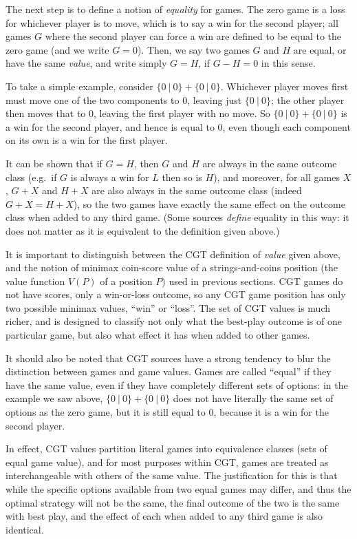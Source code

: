 \documentclass[a4paper,twocolumn]{article}
\newcommand{\cgtgame}[2]{\{#1 \:|\: #2\}}
\begin{document}
The next step is to define a notion of \emph{equality} for games. The
zero game is a loss for whichever player is to move, which is to say a
win for the second player; all games $G$ where the second player can
force a win are defined to be equal to the zero game (and we write $G
= 0$). Then, we say two games $G$ and $H$ are equal, or have the same
\emph{value}, and write simply $G = H$, if $G - H = 0$ in this sense.

To take a simple example, consider $\cgtgame{0}{0} +
\cgtgame{0}{0}$. Whichever player moves first must move one of the two
components to $0$, leaving just $\cgtgame{0}{0}$; the other player
then moves that to $0$, leaving the first player with no move. So
$\cgtgame{0}{0} + \cgtgame{0}{0}$ is a win for the second player, and
hence is equal to $0$, even though each component on its own is a win
for the first player.

It can be shown that if $G = H$, then $G$ and $H$ are always in the
same outcome class (e.g.\ if $G$ is always a win for $L$ then so is
$H$), and moreover, for all games $X$, $G+X$ and $H+X$ are also always
in the same outcome class (indeed $G+X = H+X$), so the two games have
exactly the same effect on the outcome class when added to any third
game. (Some sources \emph{define} equality in this way: it does not
matter as it is equivalent to the definition given above.)

It is important to distinguish between the CGT definition of
\emph{value} given above, and the notion of minimax coin-score value
of a strings-and-coins position (the value function $V(P)$ of a
position $P$) used in previous sections. CGT games do not have scores,
only a win-or-loss outcome, so any CGT game position has only two
possible minimax values, ``win'' or ``loss''. The set of CGT values is
much richer, and is designed to classify not only what the best-play
outcome is of one particular game, but also what effect it has when
added to other games.

It should also be noted that CGT sources have a strong tendency to
blur the distinction between games and game values. Games are called
``equal'' if they have the same value, even if they have completely
different sets of options: in the example we saw above, $\cgtgame{0}{0}
+ \cgtgame{0}{0}$ does not have literally the same set of options as
the zero game, but it is still equal to $0$, because it is a win for
the second player.

In effect, CGT values partition literal games into equivalence classes
(sets of equal game value), and for most purposes within CGT, games
are treated as interchangeable with others of the same value. The
justification for this is that while the specific options available
from two equal games may differ, and thus the optimal strategy will
not be the same, the final outcome of the two is the same with best
play, and the effect of each when added to any third game is also
identical.
\end{document}
